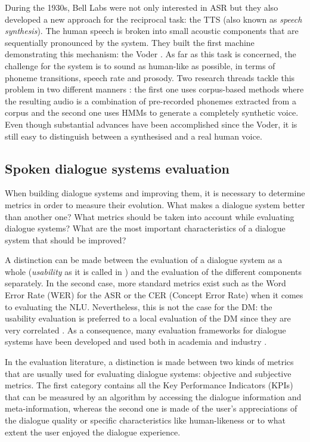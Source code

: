                        During the 1930s, Bell Labs were not only interested in ASR but they also developed a new approach for the reciprocal task: the TTS (also known as \textit{speech synthesis}). The human speech is broken into small acoustic components that are sequentially pronounced by the system. They built the first machine demonstrating this mechanism: the Voder \cite{Dudley1939}. As far as this task is concerned, the challenge for the system is to sound as human-like as possible, in terms of phoneme transitions, speech rate and prosody. Two research threads tackle this problem in two different manners \cite{Tabet2011}: the first one uses corpus-based methods where the resulting audio is a combination of pre-recorded phonemes extracted from a corpus and the second one uses HMMs to generate a completely synthetic voice. Even though substantial advances have been accomplished since the Voder, it is still easy to distinguish between a synthesised and a real human voice.

                        \subsection{Spoken dialogue systems evaluation}

                        When building dialogue systems and improving them, it is necessary to determine metrics in order to measure their evolution. What makes a dialogue system better than another one? What metrics should be taken into account while evaluating dialogue systems? What are the most important characteristics of a dialogue system that should be improved?
                        
                        A distinction can be made between the evaluation of a dialogue system as a whole (\textit{usability} as it is called in \cite{Moller2007}) and the evaluation of the different components separately. In the second case, more standard metrics exist such as the Word Error Rate (WER) for the ASR or the CER (Concept Error Rate) when it comes to evaluating the NLU. Nevertheless, this is not the case for the DM: the usability evaluation is preferred to a local evaluation of the DM since they are very correlated \cite{Dybkjaer2004}. As a consequence, many evaluation frameworks for dialogue systems have been developed and used both in academia \cite{Walker1997,Hone2000,Schmitt2012} and industry \cite{Evanini2008,Witt2011}.

                        In the evaluation literature, a distinction is made between two kinds of metrics that are usually used for evaluating dialogue systems: objective and subjective metrics. The first category contains all the Key Performance Indicators (KPIs) that can be measured by an algorithm by accessing the dialogue information and meta-information, whereas the second one is made of the user's appreciations of the dialogue quality or specific characteristics like human-likeness or to what extent the user enjoyed the dialogue experience.

